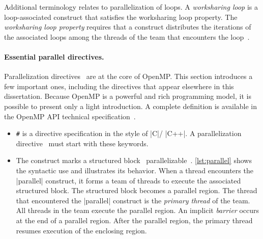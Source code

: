 Additional terminology relates to parallelization of loops.
A \emph{worksharing loop} is a loop-associated construct that satisfies
the worksharing loop property.
The \emph{worksharing loop property} requires that a construct
distributes the iterations of the associated loops among the threads of the team that encounters the loop~\cite[p. 113]{openmp_api}.

\paragraph*{Essential parallel directives.}
{Parallelization directives}~ are at the core of OpenMP.
This section introduces a few important ones, including the directives that appear elsewhere in this dissertation.
Because OpenMP is a powerful and rich programming model, it is possible to present only a light introduction.
A complete definition is available in the OpenMP API technical specification~\cite{openmp_api}.

\begin{itemize}

\item \texttt{\#}
is a directive specification in the style of
\pr|C|/%
\pr|C++|.
A {parallelization directive}~ must start with these keywords.

\item The  construct
marks a {structured block}~ parallelizable~\cite[p. 384--385]{openmp_api}.
\autoref{lst:parallel} shows the syntactic use and illustrates its behavior.
When a thread encounters the \pr|parallel| construct,
it forms a {team of threads} to execute the associated {structured block}.
The structured block becomes a {parallel region}.
The thread that encountered the \pr|parallel| construct is the \emph{primary thread} of the team.
All threads in the team execute the {parallel region}.
An implicit \emph{barrier} occurs at the end of a {parallel region}.
After the parallel region, the {primary thread} resumes execution of the enclosing region.

\end{itemize}

